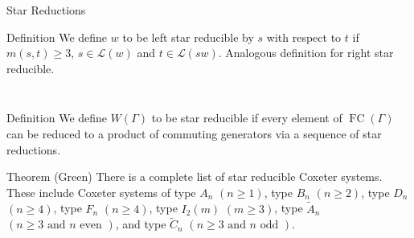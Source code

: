 \documentclass[9pt,handout]{beamer}
\DeclareMathOperator{\FC}{FC}
\newcommand{\LD}{\mathcal{L}}
\newcommand\heapblock[4]{\fill[fill=#4, fill opacity=0.35, draw=#4, line width=1.1pt, rounded corners,shift={(\xxaxis:#1)},shift={(\yyaxis:#2)}] (-1,-1) rectangle (1,1);\node at (#1,#2) {\footnotesize $#3$};}
\newcommand\dheapblock[4]{\draw[dotted, draw=#4, line width=1.1pt, rounded corners,shift={(\xxaxis:#1)},shift={(\yyaxis:#2)}] (-1,-1) rectangle (1,1);\node at (#1,#2) {\footnotesize $#3$};}
\newcommand\xxaxis{0}
\newcommand\yyaxis{90}
\begin{document}
\begin{frame}{Star Reductions}
\begin{block}{Definition}
	We define $w$ to be \alert{left star reducible by $s$ with respect to $t$} if $m(s,t) \geq 3$, $s \in \LD(w)$ and $ t \in \LD(sw)$. Analogous definition for \alert{right star reducible}.
\end{block}

\pause

\vspace{-1em}

\begin{columns}
\begin{column}{0.4\textwidth}
\begin{figure} \centering
{}
\end{figure}	
\end{column}
	
\begin{column}{0.4\textwidth}	
\begin{figure}
\end{figure}
\end{column}
\end{columns}

\pause

\begin{block}{Definition}
	We define $W(\Gamma)$ to be \alert{star reducible} if every element of $\FC(\Gamma)$ can be reduced to a product of commuting generators via a sequence of star reductions.
\end{block}

\pause

\begin{block}{Theorem (Green)}
	There is a complete list of star reducible Coxeter systems. These include Coxeter systems of type $A_n$ $(n \geq 1)$, type $B_n$ $(n \geq 2)$, type $D_n$ $(n \geq 4)$, type $F_n$ $(n \geq 4)$, type $I_2(m)$ $(m \geq 3)$, type $\widetilde{A}_{n}$ $(n \geq 3 \text{ and } n \text{ even })$, and type $\widetilde{C}_{n}$ $(n\geq 3 \text{ and } n \text{ odd })$.
\end{block}
	
\end{frame}
\end{document}
